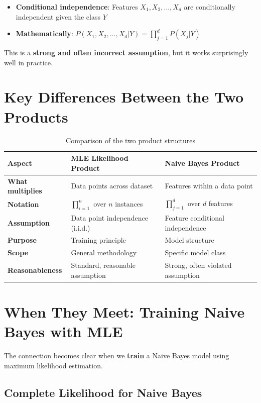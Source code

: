 \begin{notechapter}
\begin{itemize}
    \item \textbf{Conditional independence}: Features $X_1, X_2, \ldots, X_d$ are conditionally independent given the class $Y$
    \item \textbf{Mathematically}: $P(X_1, X_2, \ldots, X_d | Y) = \prod_{j=1}^d P(X_j | Y)$
\end{itemize}

This is a \textbf{strong and often incorrect assumption}, but it works surprisingly well in practice.

\section{Key Differences Between the Two Products}

\begin{table}[h]
\centering
\begin{tabular}{p{}p{}p{}}
\toprule
\textbf{Aspect} & \textbf{MLE Likelihood Product} & \textbf{Naive Bayes Product} \\
\midrule
\textbf{What multiplies} & Data points across dataset & Features within a data point \\
\hline
\textbf{Notation} & $\prod_{i=1}^n$ over $n$ instances & $\prod_{j=1}^d$ over $d$ features \\
\hline
\textbf{Assumption} & Data point independence (i.i.d.) & Feature conditional independence \\
\hline
\textbf{Purpose} & Training principle & Model structure \\
\hline
\textbf{Scope} & General methodology & Specific model class \\
\hline
\textbf{Reasonableness} & Standard, reasonable assumption & Strong, often violated assumption \\
\bottomrule
\end{tabular}
\caption{Comparison of the two product structures}
\end{table}

\section{When They Meet: Training Naive Bayes with MLE}

The connection becomes clear when we \textbf{train} a Naive Bayes model using maximum likelihood estimation.

\subsection{Complete Likelihood for Naive Bayes}


\end{notechapter}
